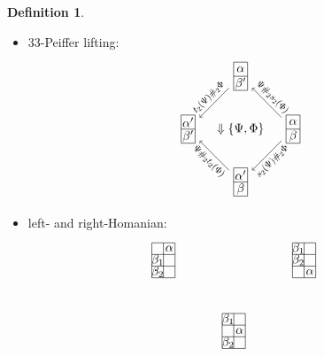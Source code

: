 \documentclass[11pt, reqno]{amsart} %
\newcommand{\strrect}[3][]{
  \begin{scope}[every node/.append style={overlay},#1]
    \foreach \x [count=\i] in {#3}{
      \ifx\x\empty
      \else
        \pgfmathsetmacro{\modResult}{mod(\i-1, #2)}
        \pgfmathsetmacro{\quotResult}{(\i-\modResult-1)/#2}
        \node at (\modResult,-\quotResult) {\x};
      \fi
    }
    \foreach \x in {0,1,...,#2}{
      \draw ({-1/2+\x},{1/2})--({-1/2+\x},{-#2+1/2});
      \draw ({-1/2},{1/2-\x})--({#2-1/2},{1/2-\x});
    }
  \end{scope}
}
\newcommand{\strsquare}[4][]{
  \begin{scope}[every node/.append style={overlay},#1]
    \foreach \x [count=\i] in {#4}{
      \ifx\x\empty
      \else
        \pgfmathsetmacro{\modResult}{mod(\i-1, #2)}
        \pgfmathsetmacro{\quotResult}{(\i-\modResult-1)/#2}
        \node at (\modResult,-\quotResult) {\x};
      \fi
    }
    \foreach \x in {0,1,...,#2}{
      \draw ({-1/2+\x},{1/2})--({-1/2+\x},{-#3+1/2});
    }
    \foreach \y in {0,1,...,#3}{
      \draw ({-1/2},{1/2-\y})--({#2-1/2},{1/2-\y});
    }
  \end{scope}
}
\theoremstyle{definition}
\newtheorem{definition}[theorem]{Definition}
\theoremstyle{remark}
\numberwithin{equation}{section}
\begin{document}
\begin{definition}
\begin{itemize}
\begin{align}
\begin{tikzpicture}[baseline=-2pt]
      \node (C) at (-1.5,0) {\tikz[baseline=-2pt,scale=.33]{\strrect{2}{,$\alpha'$,$\beta$,}}};
      \draw [thick,->] (A) to node [anchor=south west,transform shape,scale=.75] {$\begin{bmatrix}\beta & \\ & \Phi\end{bmatrix}$} (B1);
      \draw [thick,->] (A) to node [sloped,anchor=north] {$\{\beta,\alpha\}$} (B2);
      \draw [thick,->] (B1) to node [sloped,anchor=south] {$\{\beta',\alpha\}$} (C);
      \draw [thick,->] (B2) to node [anchor=north east,transform shape,scale=.75] {$\begin{bmatrix} & \Phi\\\beta & \end{bmatrix}$} (C);
      \path (B1) to node {$\Downarrow \{\beta,\Phi\}$} (B2);
    \end{tikzpicture}
  \end{align}
  \item [$\bullet$] 33-Peiffer lifting:
  \[
    \begin{tikzpicture}[baseline=-2pt]
      \node (A) at (1.5,0) {\tikz[baseline=-2pt,scale=.4]{\strsquare{1}{2}{$\alpha$,$\beta$}}};
      \node (B1) at (0,1.5) {\tikz[baseline=-2pt,scale=.4]{\strsquare{1}{2}{$\alpha$,$\beta'$}}};
      \node (B2) at (0,-1.5) {\tikz[baseline=-2pt,scale=.4]{\strsquare{1}{2}{$\alpha'$,$\beta$}}};
      \node (C) at (-1.5,0) {\tikz[baseline=-2pt,scale=.4]{\strsquare{1}{2}{$\alpha'$,$\beta'$}}};
      \draw [->] (A) to node [anchor=south,sloped,transform shape,scale=.75] {$\Psi\#_2s_2(\Phi)$} (B1);
      \draw [->] (B1) to node [anchor=south,sloped,transform shape,scale=.75] {$t_2(\Psi)\#_2\Phi$} (C);
      \draw [->] (A) to node [anchor=north,sloped,transform shape,scale=.75] {$s_2(\Psi)\#_2\Phi$} (B2);
      \draw [->] (B2) to node [anchor=north,sloped,transform shape,scale=.75] {$\Psi\#_2t_2(\Phi)$} (C);
      \path (B1) to node {$\Downarrow \{\Psi,\Phi\}$} (B2);
    \end{tikzpicture}
  \]
  \item [$\bullet$] left- and right-Homanian:
  \begin{align}
    \nonumber
    &
    \begin{tikzpicture}[baseline=-2pt]
      \node (A) at (2,0) {\tikz[baseline=-2pt,scale=.33]{\strsquare{2}{3}{$\beta_1$,,$\beta_2$,,,$\alpha$}}};
      \node (B) at (0,-2) {\tikz[baseline=-2pt,scale=.33]{\strsquare{2}{3}{$\beta_1$,,,$\alpha$,$\beta_2$,}}};
      \node (C) at (-2,0) {\tikz[baseline=-2pt,scale=.33]{\strsquare{2}{3}{,$\alpha$,$\beta_1$,,$\beta_2$,}}};

\end{tikzpicture}
\end{align}
\end{itemize}
\end{definition}
\end{document}
